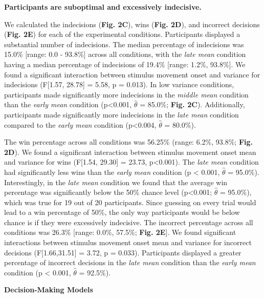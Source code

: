 \documentclass[12pt]{article}
\newcommand\boldblue[1]{\textcolor{mydarkblue}{\textbf{#1}}}
\begin{document}
\vspace*{2mm}
\noindent \boldblue{{{Participants are suboptimal and excessively indecisive.}}}

\noindent We calculated the indecisions (\boldblue{Fig. 2C}), wins (\boldblue{Fig. 2D}), and incorrect decisions (\boldblue{Fig. 2E}) for each of the experimental conditions. Participants displayed a substantial number of indecisions. The median percentage of indecisions was 15.0\% [range: 0.0 - 93.8\%] across all conditions, with the \emph{late mean} condition having a median percentage of indecisions of 19.4\% [range: 1.2\%, 93.8\%]. We found a significant interaction between stimulus movement onset and variance for indecisions (F[1.57, 28.78] = 5.58, p = 0.013). In low variance conditions, participants made significantly more indecisions in the \emph{middle mean} condition than the \emph{early mean} condition (p<0.001, $\hat{\theta}$ = 85.0\%; \boldblue{Fig. 2C}). Additionally, participants made significantly more indecisions in the \emph{late mean} condition compared to the \emph{early mean} condition (p<0.004, $\hat{\theta}$ = 80.0\%).

The win percentage across all conditions was 56.25\% (range: 6.2\%, 93.8\%; \boldblue{Fig. 2D}). We found a significant interaction between stimulus movement onset mean and variance for wins (F[1.54, 29.30] = 23.73, p<0.001). The \emph{late mean} condition had significantly less wins than the \emph{early mean} condition (p < 0.001, $\hat{\theta}$ = 95.0\%). Interestingly, in the \emph{late mean} condition we found that the average win percentage was significantly below the 50\% chance level (p<0.001; $\hat{\theta}$ = 95.0\%), which was true for 19 out of 20 participants. Since guessing on every trial would lead to a win percentage of 50\%, the only way participants would be below chance is if they were excessively indecisive.
The incorrect percentage across all conditions was 26.3\% [range: 0.0\%, 57.5\%; \boldblue{Fig. 2E}]. We found significant interactions between stimulus movement onset mean and variance for incorrect decisions (F[1.66,31.51] = 3.72, p = 0.033). Participants displayed a greater percentage of incorrect decisions in the \emph{late mean} condition than the \emph{early mean} condition (p < 0.001, $\hat{\theta}$ = 92.5\%).


\vspace{10mm}
\noindent \boldblue{{{Decision-Making Models}}}
\end{document}
